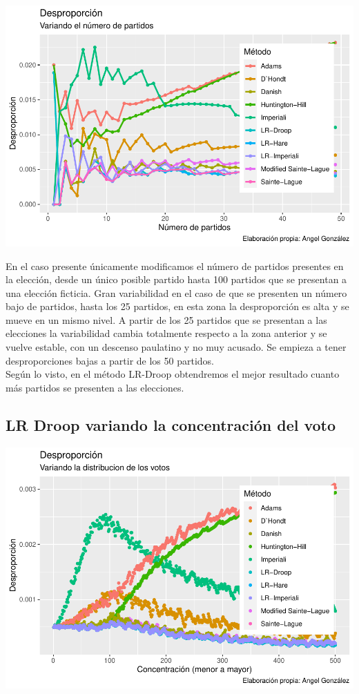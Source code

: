 \documentclass[12pt,a4paper,]{book}
\numberwithin{dummy}{section}
\theoremstyle{ocrenumbox}
\theoremstyle{blacknumex}
\theoremstyle{blacknumbox}
\theoremstyle{ocrenum}
\theoremstyle{ocrenum}
\begin{document}
\begin{center}\includegraphics[width=0.95\linewidth]{figurasR/unnamed-chunk-57-1} \end{center}

En el caso presente únicamente modificamos el número de partidos
presentes en la elección, desde un único posible partido hasta 100
partidos que se presentan a una elección ficticia. Gran variabilidad en
el caso de que se presenten un número bajo de partidos, hasta los 25
partidos, en esta zona la desproporción es alta y se mueve en un mismo
nivel. A partir de los 25 partidos que se presentan a las elecciones la
variabilidad cambia totalmente respecto a la zona anterior y se vuelve
estable, con un descenso paulatino y no muy acusado. Se empieza a tener
desproporciones bajas a partir de los 50 partidos.\\
Según lo visto, en el método LR-Droop obtendremos el mejor resultado
cuanto más partidos se presenten a las elecciones.

\hypertarget{lr-droop-variando-la-concentraciuxf3n-del-voto}{%
\subsection{LR Droop variando la concentración del
voto}\label{lr-droop-variando-la-concentraciuxf3n-del-voto}}

\begin{center}\includegraphics[width=0.95\linewidth]{figurasR/unnamed-chunk-58-1} \end{center}
\end{document}
